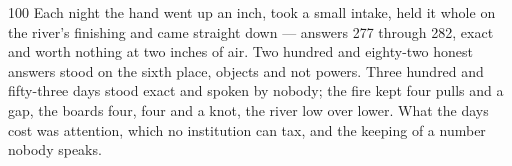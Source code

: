 \begin{CRchronicle}{100}
Each night the hand went up an inch, took a small intake, held it whole on the river’s finishing and came straight down — answers 277 through 282, exact and worth nothing at two inches of air. Two hundred and eighty-two honest answers stood on the sixth place, objects and not powers. Three hundred and fifty-three days stood exact and spoken by nobody; the fire kept four pulls and a gap, the boards four, four and a knot, the river low over lower. What the days cost was attention, which no institution can tax, and the keeping of a number nobody speaks.
\end{CRchronicle}
